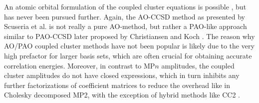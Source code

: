 An atomic orbital formulation of the coupled cluster equations is possible \cite{Scu1999}, but has never been pursued further. Again, the AO-CCSD method as presented by Scuseria et al. is not really a pure AO-method, but rather a PAO-like approach similar to PAO-CCSD later proposed by Christiansen and Koch \cite{Chr2006}. The reason why AO/PAO coupled cluster methods have not been popular is likely due to the very high prefactor for larger basis sets, which are often crucial for obtaining accurate correlation energies. Moreover, in contrast to MP$n$ amplitudes, the coupled cluster amplitudes do not have closed expressions, which in turn inhibits any further factorizations of coefficient matrices to reduce the overhead like in Cholesky decomposed MP2, with the exception of hybrid methods like CC2 \cite{Sac2021}.



